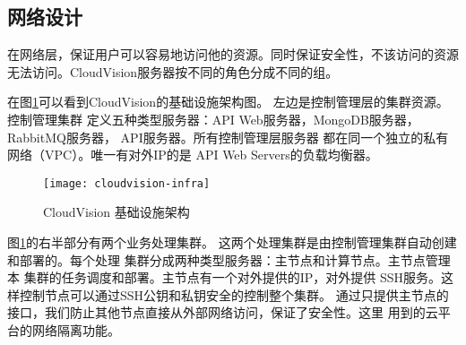 \subsection{网络设计}
在网络层，保证用户可以容易地访问他的资源。同时保证安全性，不该访问的资源
无法访问。CloudVision服务器按不同的角色分成不同的组。

在图\ref{fig:cloudvision-infra}可以看到CloudVision的基础设施架构图。
左边是控制管理层的集群资源。控制管理集群
定义五种类型服务器：API Web服务器，MongoDB服务器，
RabbitMQ服务器， API服务器。所有控制管理层服务器
都在同一个独立的私有网络（VPC）。唯一有对外IP的是
API Web Servers的负载均衡器。
\begin{figure}[h]
  \centering
    \texttt{[image: cloudvision-infra]}
  \caption{CloudVision 基础设施架构}
  \label{fig:cloudvision-infra}
\end{figure}

图\ref{fig:cloudvision-infra}的右半部分有两个业务处理集群。
这两个处理集群是由控制管理集群自动创建和部署的。每个处理
集群分成两种类型服务器：主节点和计算节点。主节点管理本
集群的任务调度和部署。主节点有一个对外提供的IP，对外提供
SSH服务。这样控制节点可以通过SSH公钥和私钥安全的控制整个集群。
通过只提供主节点的接口，我们防止其他节点直接从外部网络访问，保证了安全性。这里
用到的云平台的网络隔离功能。


